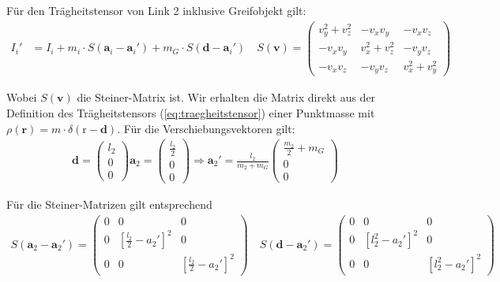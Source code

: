 \documentclass[a4paper, 12pt]{scrartcl}
\begin{document}
Für den Trägheitstensor von Link 2 inklusive Greifobjekt gilt:
\begin{align*}
    I_{i}' 
    &= 
    I_{i} + m_{i} \cdot S(\textbf{a}_{i} - \textbf{a}_{i}') 
    + m_{G} \cdot S(\textbf{d} - \textbf{a}_{i}')
    \quad
    S(\textbf{v}) =
    \begin{pmatrix}
        v_{y}^2 + v_{z}^2 & -v_{x} v_{y} & -v_{x} v_{z} \\
        -v_{x} v_{y} & v_{x}^2 + v_{z}^2 & -v_{y} v_{z} \\
        -v_{x} v_{z} & -v_{y} v_{z} & v_{x}^2 + v_{y}^2
    \end{pmatrix}
\end{align*}

Wobei $S(\textbf{v})$ die Steiner-Matrix ist. 
Wir erhalten die Matrix direkt aus der Definition des Trägheitstensors (\ref{eq:traegheitstensor}) einer Punktmasse
mit $\rho(\textbf{r}) = m \cdot \delta(\text{r}-\textbf{d})$.
Für die Verschiebungsvektoren gilt:
\begin{align*}
    \textbf{d}
    =
    \begin{pmatrix}
        l_2 \\
        0 \\
        0 
    \end{pmatrix}
    \textbf{a}_{2} =
    \begin{pmatrix}
        \frac{l_2}{2} \\
        0 \\
        0 
    \end{pmatrix}
    \Rightarrow
    \textbf{a}_{2}'
    =
    \frac{l_2}{m_{2} + m_{G}}
    \begin{pmatrix}
        \frac{m_{2}}{2} + m_{G} \\
        0 \\
        0
    \end{pmatrix}
\end{align*}

Für die Steiner-Matrizen gilt entsprechend
\begin{align*}
    S(\textbf{a}_{2} - \textbf{a}_{2}')
    =
    \begin{pmatrix}
        0 & 0 & 0 \\
        0 & \left[\frac{l_2}{2} - a_{2}'\right]^2 & 0 \\
        0 & 0 & \left[\frac{l_2}{2} - a_{2}'\right]^2
    \end{pmatrix}
    \quad
    S(\textbf{d} - \textbf{a}_{2}')
    =
    \begin{pmatrix}
        0 & 0 & 0 \\
        0 & \left[l_2^2 - a_{2}'\right]^2 & 0 \\
        0 & 0 & \left[l_2^2 - a_{2}'\right]^2
    \end{pmatrix}
\end{align*}
\end{document}
